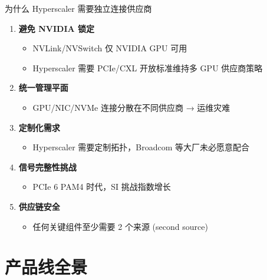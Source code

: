 \documentclass[aspectratio=169, 10pt, UTF8]{ctexbeamer}
\begin{document}
\begin{frame}{为什么 Hyperscaler 需要独立连接供应商}
  \begin{enumerate}
    \item \textbf{避免 NVIDIA 锁定}
    \begin{itemize}
      \item NVLink/NVSwitch 仅 NVIDIA GPU 可用
      \item Hyperscaler 需要 PCIe/CXL 开放标准维持多 GPU 供应商策略
    \end{itemize}

    \item \textbf{统一管理平面}
    \begin{itemize}
      \item GPU/NIC/NVMe 连接分散在不同供应商 → 运维灾难
    \end{itemize}

    \item \textbf{定制化需求}
    \begin{itemize}
      \item Hyperscaler 需要定制拓扑，Broadcom 等大厂未必愿意配合
    \end{itemize}

    \item \textbf{信号完整性挑战}
    \begin{itemize}
      \item PCIe 6 PAM4 时代，SI 挑战指数增长
    \end{itemize}

    \item \textbf{供应链安全}
    \begin{itemize}
      \item 任何关键组件至少需要 2 个来源 (second source)
    \end{itemize}
  \end{enumerate}
\end{frame}

\section{产品线全景}
\end{document}
